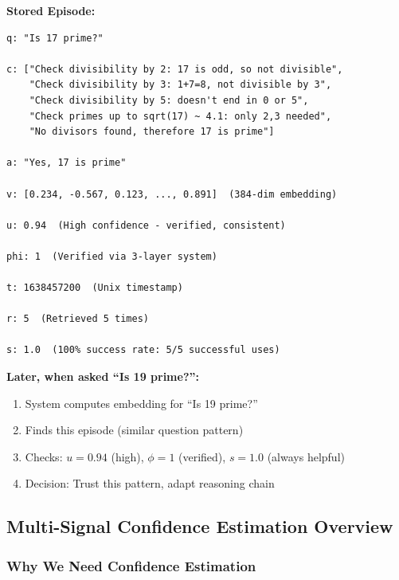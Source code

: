 \documentclass[12pt,a4paper]{article}
\theoremstyle{definition}
\begin{document}
\begin{examplebox}
\textbf{Stored Episode:}

\begin{verbatim}
q: "Is 17 prime?"

c: ["Check divisibility by 2: 17 is odd, so not divisible",
    "Check divisibility by 3: 1+7=8, not divisible by 3",
    "Check divisibility by 5: doesn't end in 0 or 5",
    "Check primes up to sqrt(17) ~ 4.1: only 2,3 needed",
    "No divisors found, therefore 17 is prime"]

a: "Yes, 17 is prime"

v: [0.234, -0.567, 0.123, ..., 0.891]  (384-dim embedding)

u: 0.94  (High confidence - verified, consistent)

phi: 1  (Verified via 3-layer system)

t: 1638457200  (Unix timestamp)

r: 5  (Retrieved 5 times)

s: 1.0  (100% success rate: 5/5 successful uses)
\end{verbatim}

\textbf{Later, when asked ``Is 19 prime?'':}
\begin{enumerate}
    \item System computes embedding for ``Is 19 prime?''
    \item Finds this episode (similar question pattern)
    \item Checks: $u = 0.94$ (high), $\phi = 1$ (verified), $s = 1.0$ (always helpful)
    \item Decision: Trust this pattern, adapt reasoning chain
\end{enumerate}
\end{examplebox}

\subsection{Multi-Signal Confidence Estimation Overview}

\subsubsection{Why We Need Confidence Estimation}
\end{document}
